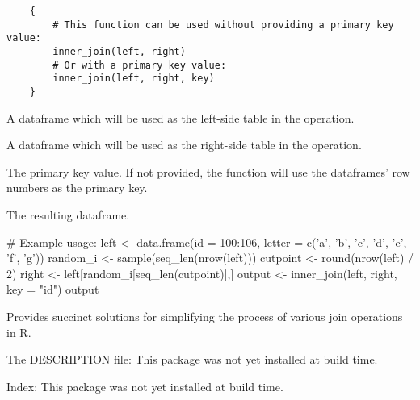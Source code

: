 \documentclass[a4paper]{book}
\begin{document}
%
\begin{Usage}
\begin{verbatim}
    {
        # This function can be used without providing a primary key value:
        inner_join(left, right)
        # Or with a primary key value:
        inner_join(left, right, key)
    }
\end{verbatim}
\end{Usage}
%
\begin{Arguments}
\begin{ldescription}
\item[\code{left}] A dataframe which will be used as the left-side table in the operation.
\item[\code{right}] A dataframe which will be used as the right-side table in the operation.
\item[\code{key}] The primary key value. If not provided, the function will use the dataframes' row numbers as the primary key.
\end{ldescription}
\end{Arguments}
%
\begin{Value}
\begin{ldescription}
\item[\code{rtn}] The resulting dataframe.
\end{ldescription}
\end{Value}
%
\begin{Examples}
\begin{ExampleCode}
    # Example usage:
    left <- data.frame(id = 100:106, letter = c('a', 'b', 'c', 'd', 'e', 'f', 'g'))
    random_i <- sample(seq_len(nrow(left)))
    cutpoint <- round(nrow(left) / 2)
    right <- left[random_i[seq_len(cutpoint)],]
    output <- inner_join(left, right, key = "id")
    output
\end{ExampleCode}
\end{Examples}
%
\begin{Description}\relax
Provides succinct solutions for simplifying the process of various join operations in R.
\end{Description}
%
\begin{Details}\relax

The DESCRIPTION file:
This package was not yet installed at build time.\\{}

Index:  This package was not yet installed at build time.\\{}
\end{Details}
\end{document}
